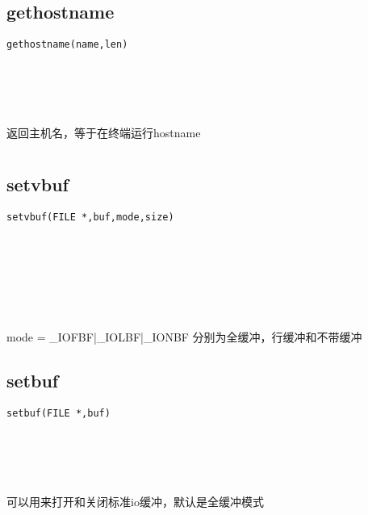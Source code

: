 \documentclass[10pt,a4paper]{article}
\begin{document}
\subsection{gethostname}
\begin{spacing}{2.0}
\lstset{language=C,numbers=none}
\begin{lstlisting}
gethostname(name,len)
\end{lstlisting}
{\large\color[rgb]{0.2,0.4,0.6}{name:}} \\
{\large\color[rgb]{0.2,0.4,0.6}{len:}}
\paragraph{ \ \ }返回主机名，等于在终端运行hostname
\end{spacing}

\section{\color[rgb]{0.2,0.4,0.6}{IO缓冲区设置}}
\subsection{setvbuf}
\begin{spacing}{2.0}
\lstset{language=C,numbers=none}
\begin{lstlisting}
setvbuf(FILE *,buf,mode,size)
\end{lstlisting}
{\large\color[rgb]{0.2,0.4,0.6}{*:}} \\
{\large\color[rgb]{0.2,0.4,0.6}{buf:}} \\
{\large\color[rgb]{0.2,0.4,0.6}{mode:}} \\
{\large\color[rgb]{0.2,0.4,0.6}{size:}}
\paragraph{ \ \ }mode = \_IOFBF|\_IOLBF|\_IONBF 分别为全缓冲，行缓冲和不带缓冲
\end{spacing}

\subsection{setbuf}
\begin{spacing}{2.0}
\lstset{language=C,numbers=none}
\begin{lstlisting}
setbuf(FILE *,buf)
\end{lstlisting}
{\large\color[rgb]{0.2,0.4,0.6}{*:}} \\
{\large\color[rgb]{0.2,0.4,0.6}{buf:}}
\paragraph{ \ \ }可以用来打开和关闭标准io缓冲，默认是全缓冲模式
\end{spacing}
\end{document}
